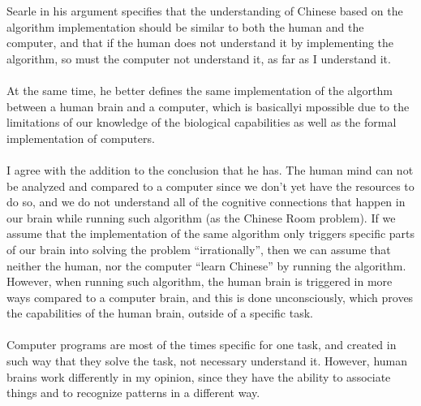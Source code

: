 \documentclass[english]{report}
\begin{document}
Searle in his argument specifies that the understanding of Chinese based on the algorithm implementation should be similar to both the human and the computer, and that if the human does not understand it by implementing the algorithm, so must the computer not understand it, as far as I understand it.
\\\\
At the same time, he better defines the same implementation of the algorthm between a human brain and a computer, which is basicallyi mpossible due to the limitations of our knowledge of the biological capabilities as well as the formal implementation of computers.
\\\\
I agree with the addition to the conclusion that he has. The human mind can not be analyzed and compared to a computer since we don't yet have the resources to do so, and we do not understand all of the cognitive connections that happen in our brain while running such algorithm (as the Chinese Room problem). If we assume that the implementation of the same algorithm only triggers specific parts of our brain into solving the problem ``irrationally'', then we can assume that neither the human, nor the computer ``learn Chinese'' by running the algorithm. However, when running such algorithm, the human brain is triggered in more ways compared to a computer brain, and this is done unconsciously, which proves the capabilities of the human brain, outside of a specific task.
\\\\
Computer programs are most of the times specific for one task, and created in such way that they solve the task, not necessary understand it. However, human brains work differently in my opinion, since they have the ability to associate things and to recognize patterns in a different way.
\end{document}
